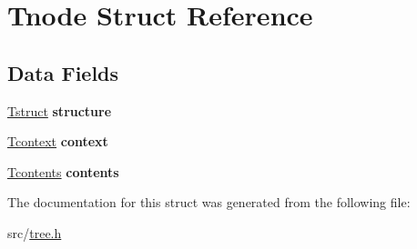 \hypertarget{structTnode}{\section{Tnode Struct Reference}
\label{structTnode}
}
\subsection*{Data Fields}
\begin{DoxyCompactItemize}
\item 
\hypertarget{structTnode_a1a5439e3e2292db7aebcad0a84d39cf5}{\hyperlink{structTstruct}{Tstruct} {\bfseries structure}}\label{structTnode_a1a5439e3e2292db7aebcad0a84d39cf5}

\item 
\hypertarget{structTnode_a8a27cc26f2ab8c3749abdd0cf96703ab}{\hyperlink{structTcontext}{Tcontext} {\bfseries context}}\label{structTnode_a8a27cc26f2ab8c3749abdd0cf96703ab}

\item 
\hypertarget{structTnode_a6be6bc8817e4158f057a3b6fc348297d}{\hyperlink{structTcontents}{Tcontents} {\bfseries contents}}\label{structTnode_a6be6bc8817e4158f057a3b6fc348297d}

\end{DoxyCompactItemize}


The documentation for this struct was generated from the following file\+:\begin{DoxyCompactItemize}
\item 
src/\hyperlink{tree_8h}{tree.\+h}\end{DoxyCompactItemize}
